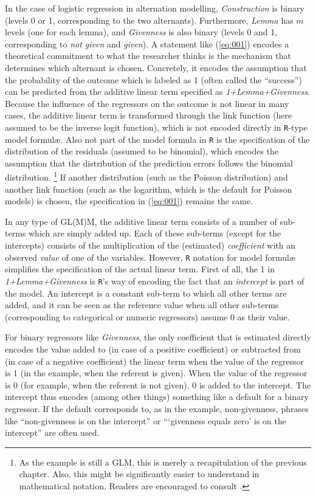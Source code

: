 
In the case of logistic regression in alternation modelling, \textit{Construction} is binary (levels 0 or 1, corresponding to the two alternants).
Furthermore, \textit{Lemma} has $m$ levels (one for each lemma), and \textit{Givenness} is also binary (levels 0 and 1, corresponding to \textit{not given} and \textit{given}).
A statement like (\ref{eq:001}) encodes a theoretical commitment to what the researcher thinks is the mechanism that determines which alternant is chosen.
Concretely, it encodes the assumption that the probability of the outcome which is labeled as 1 (often called the ``success'') can be predicted from the additive linear term specified as \textit{1+Lemma+Givenness}.
Because the influence of the regressors on the outcome is not linear in many cases, the additive linear term is transformed through the link function (here assumed to be the inverse logit function), which is not encoded directly in \texttt{R}-type model formulæ.
Also not part of the model formula in \texttt{R} is the specification of the distribution of the residuals (assumed to be binomial), which encodes the assumption that the distribution of the prediction errors follows the binomial distribution.%
\footnote{As the example is still a GLM, this is merely a recapitulation of the previous chapter.
Also, this might be significantly easier to understand in mathematical notation.
Readers are encouraged to consult \citet{GelmanHill2006}.}
If another distribution (such as the Poisson distribution) and another link function (such as the logarithm, which is the default for Poisson models) is chosen, the specification in (\ref{eq:001}) remains the same.

In any type of GL(M)M, the additive linear term consists of a number of sub-terms which are simply added up.
Each of these sub-terms (except for the intercepts) consists of the multiplication of the (estimated) \textit{coefficient} with an observed \textit{value} of one of the variables.
However, \texttt{R} notation for model formulæ simplifies the specification of the actual linear term.
First of all, the 1 in \textit{1+Lemma+Givenness} is \texttt{R}'s way of encoding the fact that an \textit{intercept} is part of the model.
An intercept is a constant sub-term to which all other terms are added, and it can be seen as the reference value when all other sub-terms (corresponding to categorical or numeric regressors) assume 0 as their value.

For binary regressors like \textit{Givenness}, the only coefficient that is estimated directly encodes the value added to (in case of a positive coefficient) or subtracted from (in case of a negative coefficient) the linear term when the value of the regressor is 1 (in the example, when the referent is given).
When the value of the regressor is 0 (for example, when the referent is not given), 0 is added to the intercept.
The intercept thus encodes (among other things) something like a default for a binary regressor.
If the default corresponds to, as in the example, non-givenness, phrases like ``non-givenness is on the intercept'' or ```givenness equals zero' is on the intercept'' are often used.

